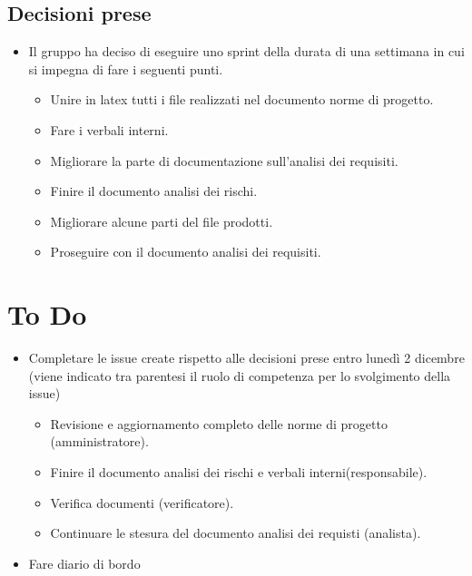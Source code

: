 \documentclass[a4paper, 12pt]{article}
\begin{document}
\subsection{Decisioni prese}
\begin{itemize}
    \item Il gruppo ha deciso di eseguire uno sprint della durata di una settimana in cui si impegna di fare i seguenti punti.
    \begin{itemize}
        \item Unire in latex tutti i file realizzati nel documento norme di progetto.
        \item Fare i verbali interni.
        \item Migliorare la parte di documentazione sull'analisi dei requisiti.
        \item Finire il documento analisi dei rischi.
        \item Migliorare alcune parti del file prodotti.
        \item Proseguire con il documento analisi dei requisiti.
    \end{itemize}
\end{itemize}

\section{To Do}
    \begin{itemize}
        \item Completare le issue create rispetto alle decisioni prese entro lunedì 2 dicembre (viene indicato tra parentesi il ruolo di competenza per lo svolgimento della issue)
        \begin{itemize}
            \item Revisione e aggiornamento completo delle norme di progetto (amministratore).
            \item Finire il documento analisi dei rischi e verbali interni(responsabile).
            \item Verifica documenti (verificatore).
            \item Continuare le stesura del documento analisi dei requisti (analista).
        \end{itemize}
        \item Fare diario di bordo
    \end{itemize}
\end{document}
